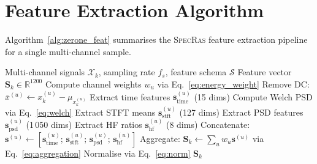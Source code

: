 \documentclass[preprint,12pt,3p]{elsarticle}
\newcommand{\zerone}{\textsc{SpecRas}\xspace}      %
\newcommand{\R}{\mathbb{R}}
\newcommand{\bs}{\mathbf{s}}
\begin{document}


\onecolumn  %
\appendix

\section{Feature Extraction Algorithm}
\label{app:algo}

Algorithm~\ref{alg:zerone_feat} summarises the \zerone feature
extraction pipeline for a single multi-channel sample.

\begin{algorithm}[t]
  \small
  \caption{\zerone Feature Extraction}
  \label{alg:zerone_feat}
  \begin{algorithmic}[1]
    \REQUIRE Multi-channel signals $\mathcal{X}_k$,
             sampling rate $f_s$, feature schema $\mathcal{S}$
    \ENSURE Feature vector $\mathbf{S}_k \in \R^{1200}$
    \STATE Compute channel weights $w_u$ via Eq.~\eqref{eq:energy_weight}
      \STATE Remove DC: $\bar{x}^{(u)} \gets x_k^{(u)} - \mu_{x_k^{(u)}}$
      \STATE Extract time features $\bs^{(u)}_\mathrm{time}$ (15 dims)
      \STATE Compute Welch PSD via Eq.~\eqref{eq:welch}
      \STATE Extract STFT means $\bs^{(u)}_\mathrm{stft}$ (127 dims)
      \STATE Extract PSD features $\bs^{(u)}_\mathrm{psd}$ (1\,050 dims)
      \STATE Extract HF ratios $\bs^{(u)}_\mathrm{hf}$ (8 dims)
      \STATE Concatenate: $\bs^{(u)} \gets [\bs^{(u)}_\mathrm{time};\,
             \bs^{(u)}_\mathrm{stft};\, \bs^{(u)}_\mathrm{psd};\,
             \bs^{(u)}_\mathrm{hf}]$
    \ENDFOR
    \STATE Aggregate: $\mathbf{S}_k \gets \sum_u w_u \bs^{(u)}$
       via Eq.~\eqref{eq:aggregation}
    \STATE Normalise via Eq.~\eqref{eq:norm}
    \RETURN $\mathbf{S}_k$
  \end{algorithmic}
\end{algorithm}
\end{document}
